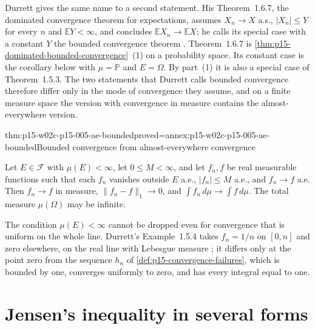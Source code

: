 Durrett gives the same name to a second statement. His Theorem~1.6.7,
the dominated convergence theorem for expectations, assumes
\(X_n\to X\) a.s., \(|X_n|\leq Y\) for every \(n\) and
\(\mathbb EY<\infty\), and concludes \(\mathbb EX_n\to\mathbb EX\); he
calls its special case with a constant \(Y\) the bounded convergence
theorem \cite[thm.~1.6.7, p.~30]{DurrettPTEAuthor2019}. Theorem~1.6.7
is \cref{thm:p15-dominated-bounded-convergence}~(1) on a probability
space. Its constant case is the corollary below with \(\mu=\mathbb P\)
and \(E=\Omega\). By part~(1) it is also a special case of
Theorem~1.5.3. The two statements that Durrett calls bounded
convergence therefore differ only in the mode of convergence they
assume, and on a finite measure space the version with convergence in
measure contains the almost-everywhere version.

\begin{hbcorollary}{thm:p15-w02c-p15-005-ae-bounded}{proved=annex:p15-w02c-p15-005-ae-bounded}{Bounded convergence from almost-everywhere convergence}
\par\nobreak
Let \(E\in\mathcal F\) with \(\mu(E)<\infty\), let \(0\leq M<\infty\),
and let \(f_n,f\) be real measurable functions such that each \(f_n\)
vanishes outside \(E\) a.e., \(|f_n|\leq M\) a.e., and \(f_n\to f\)
a.e. Then \(f_n\to f\) in measure, \(\|f_n-f\|_1\to0\), and
\(\int f_n\,d\mu\to\int f\,d\mu\). The total measure
\(\mu(\Omega)\) may be infinite.
\end{hbcorollary}

The condition \(\mu(E)<\infty\) cannot be dropped even for convergence
that is uniform on the whole line. Durrett's Example~1.5.4 takes
\(f_n=1/n\) on \([0,n]\) and zero elsewhere, on the real line with
Lebesgue measure \cite[p.~26]{DurrettPTEAuthor2019}; it differs only
at the point zero from the sequence \(h_n\) of
\cref{def:p15-convergence-failures}, which is bounded by one, converges
uniformly to zero, and has every integral equal to one.

\section{Jensen's inequality in several forms}
\label{sec:p15-w02c-p15-005-jensen}

